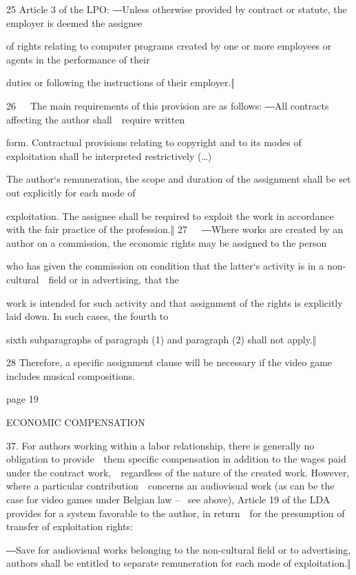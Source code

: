\documentclass[
]{article}
\begin{document}
{25 }{Article 3 of the LPO: }{―}{Unless otherwise provided by contract
or statute, the employer is deemed the assignee}

{of rights relating to computer programs created by one or more
employees or agents in the performance of their}

{duties or following the instructions of their employer}{.}{‖}

{26}{~~~}{The main requirements of this provision are as follows: ―}{All
contracts affecting the author shall~~require written}

{form. Contractual }{provisions relating to copyright and to its modes
of exploitation shall be interpreted restrictively (\ldots)}

{The author`s remuneration, the scope and duration of the assignment
shall be set out explicitly for each mode of}

{exploitation. The assignee shall be r}{equired to exploit the work in
accordance with the fair practice of the profession.‖
}{27}{~~~}{―}{Where works are created by an author on a commission, the
economic rights may be assigned to the person}

{who has given the commission on condition that the latter`s act}{ivity
is in a non-cultural~~field or in advertising, that the}

{work is intended for such activity and that assignment of the rights is
explicitly laid down. In such cases, the fourth to}

{sixth subparagraphs of paragraph (1) and paragraph (2) shall not
apply}{.}{‖}

{28 }{Therefore, a specific assignment clause will be necessary if the
video game includes musical compositions.}

{page 19}

{ECONOMIC COMPENSATION}

{37. }{For authors working within a labor relationship, there is
generally no obligation to provide~~them specific compensation in
addition to the wages paid under the contract work,~~regardless of the
nature of the created work. However, where a particular
contribution~~concerns an audiovisual work (as can be the case for video
games under Belgian law }{-- }{~see above), Article 19 of the LDA
provides for a system favorable to the author, in return~~for the
presumption of transfer of exploitation rights:}

{―}{Save for audiovisual works belonging to the non-cultural field or to
advertising, authors shall be entitled to separate remuneration for each
mode }{of exploitation.‖}
\end{document}
